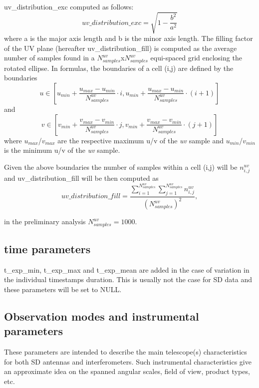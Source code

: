\documentclass[11pt,a4paper]{ivoa}
\begin{document}
uv\_distribution\_exc computed as follows:
\begin{equation}
uv\_distribution\_exc = \sqrt{1-\frac{b^2}{a^2}}
\end{equation}
where a is the major axis length and b is the minor axis length.
The filling factor of the UV plane (hereafter uv\_distribution\_fill) is computed as the average
number of samples found in a $N^{uv}_{samples}$x$N^{uv}_{samples}$ equi-spaced grid enclosing the
rotated ellipse. In formulas, the boundaries of a cell (i,j) are defined by the boundaries
\begin{equation}
u \in [u_{min} + \frac{u_{max} - u_{min}}{N^{uv}_{samples}} \cdot i , u_{min} + \frac{u_{max} -
u_{min}}{N^{uv}_{samples}} \cdot (i + 1)]
\end{equation}
and
\begin{equation}
v \in [v_{min} + \frac{v_{max} - v_{min}}{N^{uv}_{samples}} \cdot j , v_{min} + \frac{v_{max} -
v_{min}}{N^{uv}_{samples}} \cdot (j + 1)]
\end{equation}
where $u_{max}$/$v_{max}$ are the respective maximum u/v of the \emph{uv} sample and
$u_{min}$/$v_{min}$ is the minimum u/v of the \emph{uv} sample.

Given the above boundaries the number of samples within a cell (i,j) will be $n^{uv}_{i,j}$
and uv\_distribution\_fill will be then computed as
\begin{equation}
uv\_distribution\_fill = \frac{\sum^{N^{uv}_{samples}}_{i=1} \sum^{N^{uv}_{samples}}_{j=1}
n^{uv}_{i,j} }{(N^{uv}_{samples}) ^ 2},
\end{equation}

in the preliminary analysis $N^{uv}_{samples} = 1000$.



\subsection{time parameters}
t\_exp\_min, t\_exp\_max and t\_exp\_mean are added in the case of variation in the individual timestamps
duration. This is usually not the case for SD data and these parameters will be set to NULL.


\subsection{Observation modes and instrumental parameters}
These parameters are intended to describe the main telescope(s) characteristics for both SD antennas and interferometers. Such instrumental characteristics give an approximate idea on the spanned angular scales, field of view, product types, etc.
\end{document}
